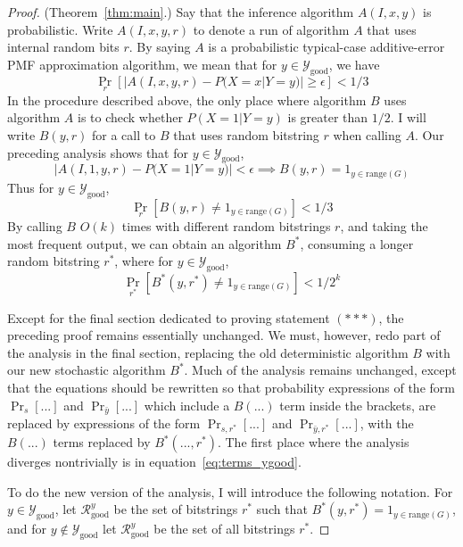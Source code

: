 \documentclass{article}
\def \Ygood{\mathcal{Y}_\text{good}}
\def \Rgood{\mathcal{R}_\text{good}}
\def \by{{\bar{y}}}
\theoremstyle{definition}
\theoremstyle{remark}
\begin{document}
\begin{proof}{(Theorem~\ref{thm:main}.)}
Say that the inference algorithm $A(I, x, y)$ is probabilistic.
Write $A(I, x, y, r)$ to denote a run of algorithm $A$ that uses internal random bits $r$.
By saying $A$ is a probabilistic typical-case additive-error PMF approximation algorithm, we mean that for $y \in \Ygood$, we have
$$
\Pr_r [|A(I, x, y, r) - P(X = x | Y = y)| \geq \epsilon] < 1/3
$$
In the procedure described above, the only place where algorithm $B$ uses algorithm $A$ is to check whether $P(X = 1 | Y = y)$ is greater than $1/2$.
I will write $B(y, r)$ for a call to $B$ that uses random bitstring $r$ when calling $A$.
Our preceding analysis shows that for $y \in \Ygood$,
$$
|A(I, 1, y, r) - P(X = 1 | Y = y)| < \epsilon \implies  B(y, r) = 1_{y \in \text{range}(G)}
$$
Thus for $y \in \Ygood$,
$$
\Pr_r [B(y, r) \neq 1_{y \in \text{range}(G)}] < 1/3
$$
By calling $B$ $O(k)$ times with different random bitstrings $r$, and taking the most frequent output, we can obtain an algorithm $B^*$, consuming a longer random bitstring $r^*$, where for $y \in \Ygood$,
$$
\Pr_{r^*} [B^*(y, r^*) \neq 1_{y \in \text{range}(G)}] < 1/2^k
$$

Except for the final section dedicated to proving statement $(***)$, the preceding proof remains essentially unchanged.
We must, however, redo part of the analysis in the final section, replacing the old deterministic algorithm $B$ with our new stochastic algorithm $B^*$.
Much of the analysis remains unchanged, except that the equations should be rewritten
so that probability expressions of the form $\Pr_s[...]$ and $\Pr_\by[...]$ which include a $B(...)$ term inside the brackets, are replaced by expressions of the form $\Pr_{s, r^*}[...]$ and $\Pr_{\by, r^*}[...]$, with the $B(...)$ terms replaced by $B^*(..., r^*)$.
The first place where the analysis diverges nontrivially is in equation~\ref{eq:terms_ygood}.

To do the new version of the analysis, I will introduce the following notation. For $y \in \Ygood$, let $\Rgood^y$ be the set of bitstrings $r^*$ such that $B^*(y, r^*) = 1_{y \in \text{range}(G)}$,
and for $y \notin \Ygood$ let $\Rgood^y$ be the set of all bitstrings $r^*$.


\end{proof}
\end{document}
